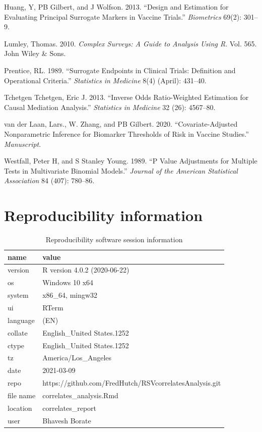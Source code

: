 \documentclass[11pt]{article}
\begin{document}
\leavevmode\hypertarget{ref-huang2013design}{}%
Huang, Y, PB Gilbert, and J Wolfson. 2013. ``Design and Estimation for Evaluating Principal Surrogate Markers in Vaccine Trials.'' \emph{Biometrics} 69(2): 301--9.

\leavevmode\hypertarget{ref-lumley2010complex}{}%
Lumley, Thomas. 2010. \emph{Complex Surveys: A Guide to Analysis Using R}. Vol. 565. John Wiley \& Sons.

\leavevmode\hypertarget{ref-prentice1989}{}%
Prentice, RL. 1989. ``Surrogate Endpoints in Clinical Trials: Definition and Operational Criteria.'' \emph{Statistics in Medicine} 8(4) (April): 431--40.

\leavevmode\hypertarget{ref-tchetgen2013inverse}{}%
Tchetgen Tchetgen, Eric J. 2013. ``Inverse Odds Ratio-Weighted Estimation for Causal Mediation Analysis.'' \emph{Statistics in Medicine} 32 (26): 4567--80.

\leavevmode\hypertarget{ref-vanderLaanetal2020}{}%
van der Laan, Lars., W. Zhang, and PB Gilbert. 2020. ``Covariate-Adjusted Nonparametric Inference for Biomarker Thresholds of Risk in Vaccine Studies.'' \emph{Manuscript}.

\leavevmode\hypertarget{ref-westfall1989p}{}%
Westfall, Peter H, and S Stanley Young. 1989. ``P Value Adjustments for Multiple Tests in Multivariate Binomial Models.'' \emph{Journal of the American Statistical Association} 84 (407): 780--86.

\clearpage

\hypertarget{reproducibility-information}{%
\section{Reproducibility information}\label{reproducibility-information}}

\begin{table}[!h]

\caption{\label{tab:Software-Session-Information}Reproducibility software session information}
\centering
\fontsize{8}{10}\selectfont
\begin{tabular}[t]{ll}
\toprule
name & value\\
\midrule
version & R version 4.0.2 (2020-06-22)\\
os & Windows 10 x64\\
system & x86\_64, mingw32\\
ui & RTerm\\
language & (EN)\\
collate & English\_United States.1252\\
ctype & English\_United States.1252\\
tz & America/Los\_Angeles\\
date & 2021-03-09\\
repo & https://github.com/FredHutch/RSVcorrelatesAnalysis.git\\
file name & correlates\_analysis.Rmd\\
location & correlates\_report\\
user & Bhavesh Borate\\
\bottomrule
\end{tabular}
\end{table}
\end{document}
